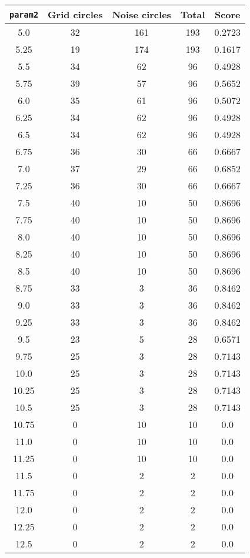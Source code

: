 \documentclass[letterpaper, 12pt]{article}
\begin{document}
\begin{longtable}{|c|c|c|c|c|}
\hline
\textbf{\texttt{param2}} & \textbf{Grid circles} & \textbf{Noise circles} & \textbf{Total} & \textbf{Score} \\
\hline
5.0 & 32 & 161 & 193 & 0.2723 \\
\hline
5.25 & 19 & 174 & 193 & 0.1617 \\
\hline
5.5 & 34 & 62 & 96 & 0.4928 \\
\hline
5.75 & 39 & 57 & 96 & 0.5652 \\
\hline
6.0 & 35 & 61 & 96 & 0.5072 \\
\hline
6.25 & 34 & 62 & 96 & 0.4928 \\
\hline
6.5 & 34 & 62 & 96 & 0.4928 \\
\hline
6.75 & 36 & 30 & 66 & 0.6667 \\
\hline
7.0 & 37 & 29 & 66 & 0.6852 \\
\hline
7.25 & 36 & 30 & 66 & 0.6667 \\
\hline
7.5 & 40 & 10 & 50 & 0.8696 \\
\hline
7.75 & 40 & 10 & 50 & 0.8696 \\
\hline
8.0 & 40 & 10 & 50 & 0.8696 \\
\hline
8.25 & 40 & 10 & 50 & 0.8696 \\
\hline
8.5 & 40 & 10 & 50 & 0.8696 \\
\hline
8.75 & 33 & 3 & 36 & 0.8462 \\
\hline
9.0 & 33 & 3 & 36 & 0.8462 \\
\hline
9.25 & 33 & 3 & 36 & 0.8462 \\
\hline
9.5 & 23 & 5 & 28 & 0.6571 \\
\hline
9.75 & 25 & 3 & 28 & 0.7143 \\
\hline
10.0 & 25 & 3 & 28 & 0.7143 \\
\hline
10.25 & 25 & 3 & 28 & 0.7143 \\
\hline
10.5 & 25 & 3 & 28 & 0.7143 \\
\hline
10.75 & 0 & 10 & 10 & 0.0 \\
\hline
11.0 & 0 & 10 & 10 & 0.0 \\
\hline
11.25 & 0 & 10 & 10 & 0.0 \\
\hline
11.5 & 0 & 2 & 2 & 0.0 \\
\hline
11.75 & 0 & 2 & 2 & 0.0 \\
\hline
12.0 & 0 & 2 & 2 & 0.0 \\
\hline
12.25 & 0 & 2 & 2 & 0.0 \\
\hline
12.5 & 0 & 2 & 2 & 0.0 \\

\end{longtable}
\end{document}
